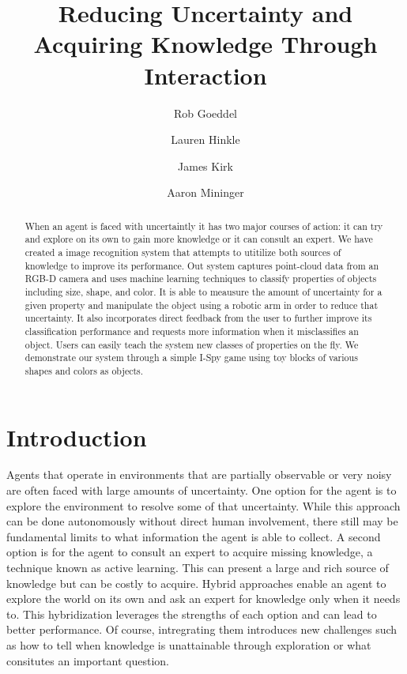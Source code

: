\documentclass[11pt]{article}
\title{Reducing Uncertainty and Acquiring Knowledge Through Interaction}
\author{Rob Goeddel \and Lauren Hinkle \and James Kirk \and Aaron Mininger}
\date{}
\newcommand{\xxx}[1]{{\bf \color{red} #1}}
\begin{document}
\maketitle


\begin{abstract}
When an agent is faced with uncertaintly it has two major courses of action: it can try and explore on its own to gain more knowledge or it can consult an expert. We have created a image recognition system that attempts to utitilize both sources of knowledge to improve its performance. Out system captures point-cloud data from an RGB-D camera and uses machine learning techniques to classify properties of objects including size, shape, and color. It is able to meausure the amount of uncertainty for a given property and manipulate the object using a robotic arm in order to reduce that uncertainty. It also incorporates direct feedback from the user to further improve its classification performance and requests more information when it misclassifies an object. Users can easily teach the system new classes of properties on the fly. We demonstrate our system through a simple I-Spy game using toy blocks of various shapes and colors as objects.
\end{abstract}


\section{Introduction}
Agents that operate in environments that are partially observable or very noisy are often faced with large amounts of uncertainty. One option for the agent is to explore the environment to resolve some of that uncertainty. While this approach can be done autonomously without direct human involvement, there still may be fundamental limits to what information the agent is able to collect. A second option is for the agent to consult an expert to acquire missing knowledge, a technique known as active learning. This can present a large and rich source of knowledge but can be costly to acquire. Hybrid approaches enable an agent to explore the world on its own and ask an expert for knowledge only when it needs to. This hybridization leverages the strengths of each option and can lead to better performance. Of course, intregrating them introduces new challenges such as how to tell when knowledge is unattainable through exploration or what consitutes an important question.
\end{document}

